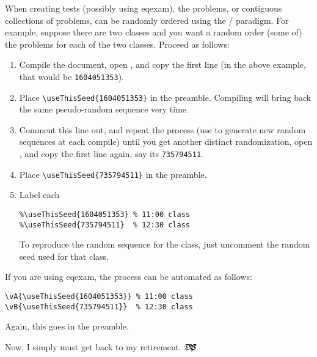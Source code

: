 \documentclass{article}
\def\dps{$\hbox{$\mathfrak D$\kern-.3em\hbox{$\mathfrak P$}%
       \kern-.6em \hbox{$\mathcal S$}}$}
\begin{document}
When creating tests (possibly using \textsf{eqexam}), the problems, or
contiguous collections of problems, can be randomly ordered using the
/ paradigm. For example, suppose there are two
classes and you want a random order (some of) the problems for each of the
two classes. Proceed as follows:
\begin{enumerate}
\item Compile the document, open , and copy the
    first line (in the above example, that would be
    \texttt{1604051353}).
\item Place \verb!\useThisSeed{1604051353}! in the preamble. Compiling
    will bring back the same pseudo-random sequence very time.
\item Comment this line out, and repeat the process (use
     to generate new random sequences at each
    compile) until you get another distinct randomization, open
    , and copy the first line again, say its \texttt{735794511}.
\item Place \verb!\useThisSeed{735794511}! in the preamble.
\item Label each
\begin{Verbatim}
%\useThisSeed{1604051353} % 11:00 class
%\useThisSeed{735794511}  % 12:30 class
\end{Verbatim}
To reproduce the random sequence for the class, just uncomment the random
seed used for that class.
\end{enumerate}
If you are using \textsf{eqexam}, the process can be automated as follows:
\begin{Verbatim}[xleftmargin=20pt,commandchars=!()]
\vA{\useThisSeed{1604051353}} % 11:00 class
\vB{\useThisSeed{735794511}}  % 12:30 class
\end{Verbatim}
Again, this goes in the preamble.

Now, I simply must get back to my retirement. \dps
\end{document}
